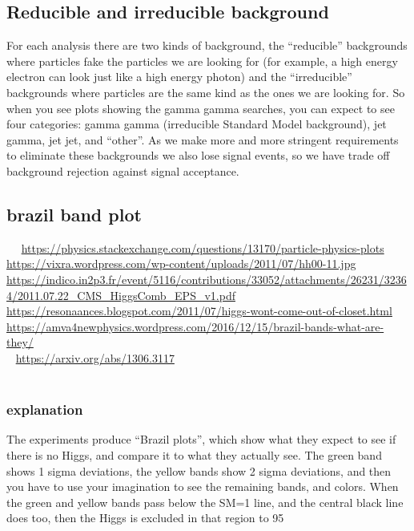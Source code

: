 \documentclass{ctexart}
\begin{document}
\subsection{Reducible and irreducible background}
For each analysis there are two kinds of background, the “reducible” backgrounds where particles fake the particles we are looking for (for example, a high energy electron can look just like a high energy photon) and the “irreducible” backgrounds where particles are the same kind as the ones we are looking for. So when you see plots showing the gamma gamma searches, you can expect to see four categories: gamma gamma (irreducible Standard Model background), jet gamma, jet jet, and “other”. As we make more and more stringent requirements to eliminate these backgrounds we also lose signal events, so we have trade off background rejection against signal acceptance.

\subsection{brazil band plot}  
\url{https://physics.stackexchange.com/questions/13170/particle-physics-plots}\\
\url{https://vixra.wordpress.com/wp-content/uploads/2011/07/hh00-11.jpg}\\
\url{https://indico.in2p3.fr/event/5116/contributions/33052/attachments/26231/32364/2011.07.22_CMS_HiggsComb_EPS_v1.pdf}\\

\url{https://resonaances.blogspot.com/2011/07/higgs-wont-come-out-of-closet.html}\\
\url{https://amva4newphysics.wordpress.com/2016/12/15/brazil-bands-what-are-they/}\\ 
\url{https://arxiv.org/abs/1306.3117}\\  

\subsubsection{explanation}
The experiments produce “Brazil plots”, which show what they expect to see if there is no Higgs, and compare it to what they actually see. The green band shows 1 sigma deviations, the yellow bands show 2 sigma deviations, and then you have to use your imagination to see the remaining bands, and colors. When the green and yellow bands pass below the SM=1 line, and the central black line does too, then the Higgs is excluded in that region to 95%
\end{document}
